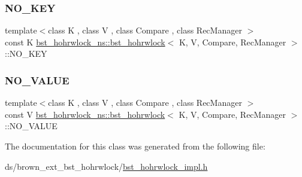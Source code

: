 \subsubsection{\texorpdfstring{N\+O\+\_\+\+K\+EY}{NO\_KEY}}
{\footnotesize\ttfamily template$<$class K , class V , class Compare , class Rec\+Manager $>$ \\
const K \hyperlink{classbst__hohrwlock__ns_1_1bst__hohrwlock}{bst\+\_\+hohrwlock\+\_\+ns\+::bst\+\_\+hohrwlock}$<$ K, V, Compare, Rec\+Manager $>$\+::N\+O\+\_\+\+K\+EY}

\mbox{\label{classbst__hohrwlock__ns_1_1bst__hohrwlock_a2e84b829c70c83ad82c2191cb90ce7a9}} 
\subsubsection{\texorpdfstring{N\+O\+\_\+\+V\+A\+L\+UE}{NO\_VALUE}}
{\footnotesize\ttfamily template$<$class K , class V , class Compare , class Rec\+Manager $>$ \\
const V \hyperlink{classbst__hohrwlock__ns_1_1bst__hohrwlock}{bst\+\_\+hohrwlock\+\_\+ns\+::bst\+\_\+hohrwlock}$<$ K, V, Compare, Rec\+Manager $>$\+::N\+O\+\_\+\+V\+A\+L\+UE}



The documentation for this class was generated from the following file\+:\begin{DoxyCompactItemize}
\item 
ds/brown\+\_\+ext\+\_\+bst\+\_\+hohrwlock/\hyperlink{bst__hohrwlock__impl_8h}{bst\+\_\+hohrwlock\+\_\+impl.\+h}\end{DoxyCompactItemize}
